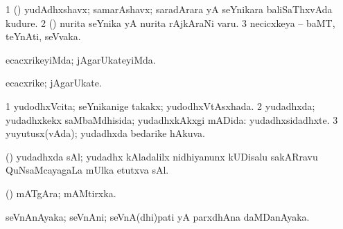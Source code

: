 {\bentry
{} 
\gl{\nA}
\expl{}
\bmng
\bnum
\num{1} (\ca) yudAdhxshavx; samarAshavx; saradArara yA seYnikara baliSaThxvAda kudure. 
\num{2} (\AmA) nurita seYnika yA nurita rAjkAraNi \mo varu. 
\num{3} necicxkeya -- baMT, teYnAti, seVvaka. 
\enum
\emng
\eentry

\bentry
{} 
\gl{\kirxvi}
\expl{}
\bmng
ecacxrikeyiMda; jAgarUkateyiMda. 
\emng
\eentry

\bentry
{} 
\gl{\nA}
\expl{}
\bmng
ecacxrike; jAgarUkate. 
\emng
\eentry

\bentry
{} 
\gl{\gu}
\expl{}
\bmng
\bnum
\num{1} yudodhxVcita; seYnikanige takakx; yudodhxVtAsxhada. 
\num{2} yudadhxda; yudadhxkekx saMbaMdhisida; yudadhxkAkxgi mADida:  yudadhxsidadhxte. 
\num{3} yuyutusx(vAda); yudadhxda bedarike hAkuva. 
\enum
\emng
\eentry

\bentry
{} 
\gl{\nA}
\expl{}
\bmng
(\birx) yudadhxda sAl; yudadhx kAladalilx nidhiyanunx kUDisalu sakARravu QuNsaMcayagaLa mUlka etutxva sAl. 
\emng
\eentry

\bentry
{} 
\gl{\nA}
\expl{}
\bmng
(\pArxparx) mATgAra; mAMtirxka. 
\emng
\eentry

\bentry
{} 
\gl{\nA}
\expl{}
\bmng
seVnAnAyaka; seVnAni; seVnA(dhi)pati yA parxdhAna daMDanAyaka. 
\emng
\eentry

}
